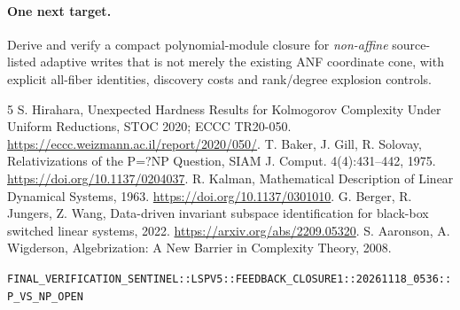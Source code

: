 \documentclass[11pt]{article}
\begin{document}
\paragraph{One next target.} Derive and verify a compact polynomial-module closure for \emph{non-affine} source-listed adaptive writes that is not merely the existing ANF coordinate cone, with explicit all-fiber identities, discovery costs and rank/degree explosion controls.

\begin{thebibliography}{5}
 S. Hirahara, Unexpected Hardness Results for Kolmogorov Complexity Under Uniform Reductions, STOC 2020; ECCC TR20-050. \url{https://eccc.weizmann.ac.il/report/2020/050/}.
 T. Baker, J. Gill, R. Solovay, Relativizations of the P=?NP Question, SIAM J. Comput. 4(4):431--442, 1975. \url{https://doi.org/10.1137/0204037}.
 R. Kalman, Mathematical Description of Linear Dynamical Systems, 1963. \url{https://doi.org/10.1137/0301010}.
 G. Berger, R. Jungers, Z. Wang, Data-driven invariant subspace identification for black-box switched linear systems, 2022. \url{https://arxiv.org/abs/2209.05320}.
 S. Aaronson, A. Wigderson, Algebrization: A New Barrier in Complexity Theory, 2008.
\end{thebibliography}
\noindent\texttt{FINAL\_VERIFICATION\_SENTINEL::LSPV5::FEEDBACK\_CLOSURE1::20261118\_0536::P\_VS\_NP\_OPEN}
\end{document}
